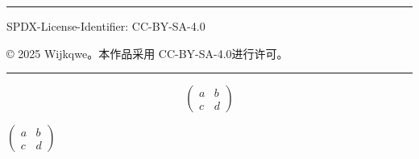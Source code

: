 \documentclass[12pt]{ctexbook}
\begin{document}



\tableofcontents
\hrule

SPDX-License-Identifier: CC-BY-SA-4.0

© 2025 Wijkqwe。本作品采用 CC-BY-SA-4.0进行许可。










\hrule




\[ \begin{pmatrix}a & b\\ c & d\end{pmatrix} \]

$\begin{pmatrix}
  a & b\\ 
  c & d
\end{pmatrix}$






\end{document}
